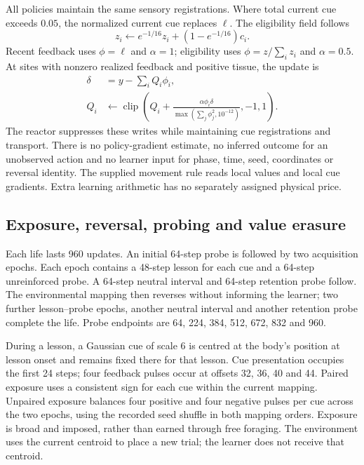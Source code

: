All policies maintain the same sensory registrations. Where total current cue exceeds $0.05$, the normalized current cue replaces $\ell$. The eligibility field follows
\begin{equation}
z_i\leftarrow e^{-1/16}z_i+(1-e^{-1/16})c_i.
\end{equation}
Recent feedback uses $\phi=\ell$ and $\alpha=1$; eligibility uses $\phi=z/\sum_i z_i$ and $\alpha=0.5$. At sites with nonzero realized feedback and positive tissue, the update is
\begin{align}
\delta &=y-\sum_i Q_i\phi_i,\\
Q_i&\leftarrow\operatorname{clip}\left(Q_i+
\frac{\alpha\phi_i\delta}{\max(\sum_j\phi_j^2,10^{-12})},-1,1\right).
\end{align}
The reactor suppresses these writes while maintaining cue registrations and transport. There is no policy-gradient estimate\cite{williams,baxter}, no inferred outcome for an unobserved action and no learner input for phase, time, seed, coordinates or reversal identity. The supplied movement rule reads local values and local cue gradients. Extra learning arithmetic has no separately assigned physical price.

\subsection*{Exposure, reversal, probing and value erasure}

Each life lasts 960 updates. An initial 64-step probe is followed by two acquisition epochs. Each epoch contains a 48-step lesson for each cue and a 64-step unreinforced probe. A 64-step neutral interval and 64-step retention probe follow. The environmental mapping then reverses without informing the learner; two further lesson--probe epochs, another neutral interval and another retention probe complete the life. Probe endpoints are 64, 224, 384, 512, 672, 832 and 960.

During a lesson, a Gaussian cue of scale 6 is centred at the body's position at lesson onset and remains fixed there for that lesson. Cue presentation occupies the first 24 steps; four feedback pulses occur at offsets 32, 36, 40 and 44. Paired exposure uses a consistent sign for each cue within the current mapping. Unpaired exposure balances four positive and four negative pulses per cue across the two epochs, using the recorded seed shuffle in both mapping orders. Exposure is broad and imposed, rather than earned through free foraging. The environment uses the current centroid to place a new trial; the learner does not receive that centroid.

